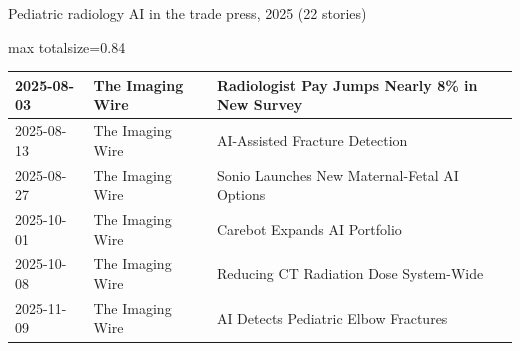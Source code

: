 \documentclass[aspectratio=169]{beamer}
\begin{document}
\begin{frame}[category=Newsletters]{Pediatric radiology AI in the trade press, 2025 (22 stories)}
\begin{adjustbox}{max totalsize={\textwidth}{0.84\textheight}}
\begin{tabular}{|l|l|>{\raggedright\arraybackslash}p{}|>{\raggedright\arraybackslash}p{}|}
2025-08-03 & The Imaging Wire & Radiologist Pay Jumps Nearly 8\% in New Survey &  \\ \hline
2025-08-13 & The Imaging Wire & AI-Assisted Fracture Detection &  \\ \hline
2025-08-27 & The Imaging Wire & Sonio Launches New Maternal-Fetal AI Options &  \\ \hline
2025-10-01 & The Imaging Wire & Carebot Expands AI Portfolio &  \\ \hline
2025-10-08 & The Imaging Wire & Reducing CT Radiation Dose System-Wide &  \\ \hline
2025-11-09 & The Imaging Wire & AI Detects Pediatric Elbow Fractures &  \\ \hline
\end{tabular}
\end{adjustbox}
\end{frame}
\end{document}
